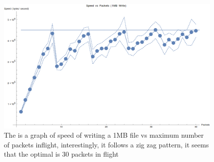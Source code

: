 \documentclass[12pt]{article}
\begin{document}
\begin{figure}[htbp]
\centering
\includegraphics[scale=0.45]{benchmark_inflight}
\caption{The is a graph of speed of writing a 1MB file vs maximum number of packets inflight, interestingly, it follows a zig zag pattern, it seems that the optimal is 30 packets in flight}
\end{figure}
\end{document}

